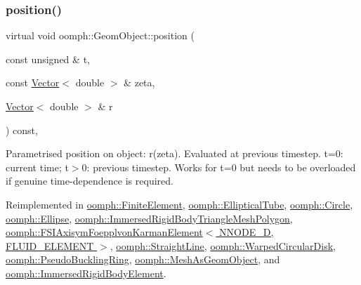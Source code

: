 \subsubsection{\texorpdfstring{position()}{position()}\hspace{0.1cm}{\footnotesize\ttfamily [2/2]}}
{\footnotesize\ttfamily virtual void oomph\+::\+Geom\+Object\+::position (\begin{DoxyParamCaption}\item[{const unsigned \&}]{t,  }\item[{const \hyperlink{classoomph_1_1Vector}{Vector}$<$ double $>$ \&}]{zeta,  }\item[{\hyperlink{classoomph_1_1Vector}{Vector}$<$ double $>$ \&}]{r }\end{DoxyParamCaption}) const\hspace{0.3cm}{\ttfamily [inline]}, {\ttfamily [virtual]}}



Parametrised position on object\+: r(zeta). Evaluated at previous timestep. t=0\+: current time; t$>$0\+: previous timestep. Works for t=0 but needs to be overloaded if genuine time-\/dependence is required. 



Reimplemented in \hyperlink{classoomph_1_1FiniteElement_ad1c757b3ea99bfac2521244a977728ed}{oomph\+::\+Finite\+Element}, \hyperlink{classoomph_1_1EllipticalTube_a01c6372a901d28892cab9e43ba8b3530}{oomph\+::\+Elliptical\+Tube}, \hyperlink{classoomph_1_1Circle_a3d318d67e50a29d7d8916cacc741435b}{oomph\+::\+Circle}, \hyperlink{classoomph_1_1Ellipse_a862ce1f7d6ac7b2c5deb613b49caa30f}{oomph\+::\+Ellipse}, \hyperlink{classoomph_1_1ImmersedRigidBodyTriangleMeshPolygon_ad1bd014b31d75703384be201ab65e80f}{oomph\+::\+Immersed\+Rigid\+Body\+Triangle\+Mesh\+Polygon}, \hyperlink{classoomph_1_1FSIAxisymFoepplvonKarmanElement_a9c86ac02c60541d451ceb50eb49914ed}{oomph\+::\+F\+S\+I\+Axisym\+Foepplvon\+Karman\+Element$<$ N\+N\+O\+D\+E\+\_\+D, F\+L\+U\+I\+D\+\_\+\+E\+L\+E\+M\+E\+N\+T $>$}, \hyperlink{classoomph_1_1StraightLine_adfa84ac4d8342089f0f69eb2efe1108f}{oomph\+::\+Straight\+Line}, \hyperlink{classoomph_1_1WarpedCircularDisk_afcc9e5e2c88d05b61006bd432e3aa31b}{oomph\+::\+Warped\+Circular\+Disk}, \hyperlink{classoomph_1_1PseudoBucklingRing_a027211cc7067efa849e605b456cb5462}{oomph\+::\+Pseudo\+Buckling\+Ring}, \hyperlink{classoomph_1_1MeshAsGeomObject_aab712c9f8a51d997c13c00eb1afaf9f4}{oomph\+::\+Mesh\+As\+Geom\+Object}, and \hyperlink{classoomph_1_1ImmersedRigidBodyElement_aca95759d96758c7a4fc81dece7768e9d}{oomph\+::\+Immersed\+Rigid\+Body\+Element}.



